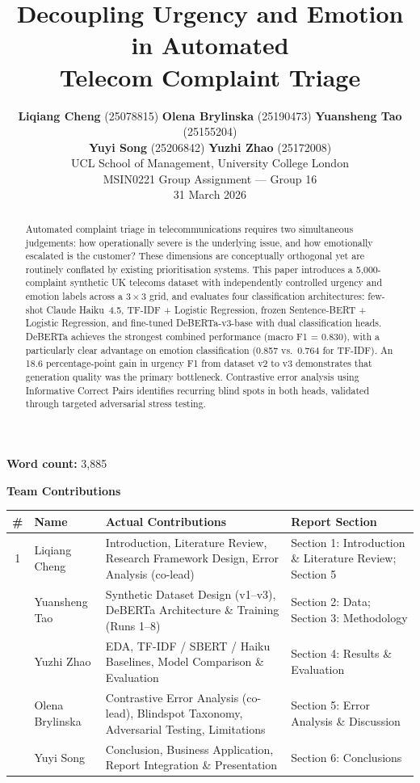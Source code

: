 \documentclass[11pt]{article}
\title{Decoupling Urgency and Emotion in Automated\\Telecom Complaint Triage}
\date{}
\author{
  \textbf{Liqiang Cheng} (25078815) \quad
  \textbf{Olena Brylinska} (25190473) \quad
  \textbf{Yuansheng Tao} (25155204) \\[2pt]
  \textbf{Yuyi Song} (25206842) \quad
  \textbf{Yuzhi Zhao} (25172008) \\[4pt]
  UCL School of Management, University College London \\
  MSIN0221 Group Assignment --- Group 16 \\
  31 March 2026
}
\begin{document}
\maketitle

\begin{abstract}
Automated complaint triage in telecommunications requires two simultaneous
judgements: how operationally severe is the underlying issue, and how
emotionally escalated is the customer? These dimensions are conceptually
orthogonal yet are routinely conflated by existing prioritisation systems.
This paper introduces a 5,000-complaint synthetic UK telecoms dataset with
independently controlled urgency and emotion labels across a $3{\times}3$
grid, and evaluates four classification architectures: few-shot Claude Haiku~4.5,
TF-IDF + Logistic Regression, frozen Sentence-BERT + Logistic Regression, and
fine-tuned DeBERTa-v3-base with dual classification heads. DeBERTa achieves
the strongest combined performance (macro F1 = 0.830), with a particularly
clear advantage on emotion classification (0.857 vs.\ 0.764 for TF-IDF).
An 18.6 percentage-point gain in urgency F1 from dataset v2 to v3 demonstrates
that generation quality was the primary bottleneck. Contrastive error analysis
using Informative Correct Pairs identifies recurring blind spots in both heads,
validated through targeted adversarial stress testing.
\end{abstract}

\noindent\textbf{Word count:} 3,885

\vspace{0.3em}
\noindent\textbf{Team Contributions}

\vspace{0.2em}
\noindent\small
\begin{tabular}{@{}clp{8.0cm}p{4.2cm}@{}}
  \toprule
  \textbf{\#} & \textbf{Name} & \textbf{Actual Contributions} & \textbf{Report Section} \\
  \midrule
  1 & Liqiang Cheng   & Introduction, Literature Review, Research Framework Design, Error Analysis (co-lead) & Section 1: Introduction \& Literature Review; Section 5 \\
  \addlinespace
  2 & Yuansheng Tao   & Synthetic Dataset Design (v1--v3), DeBERTa Architecture \& Training (Runs 1--8) & Section 2: Data; Section 3: Methodology \\
  \addlinespace
  3 & Yuzhi Zhao      & EDA, TF-IDF / SBERT / Haiku Baselines, Model Comparison \& Evaluation & Section 4: Results \& Evaluation \\
  \addlinespace
  4 & Olena Brylinska & Contrastive Error Analysis (co-lead), Blindspot Taxonomy, Adversarial Testing, Limitations & Section 5: Error Analysis \& Discussion \\
  \addlinespace
  5 & Yuyi Song       & Conclusion, Business Application, Report Integration \& Presentation & Section 6: Conclusions \\
  \bottomrule
\end{tabular}\normalsize
\end{document}
